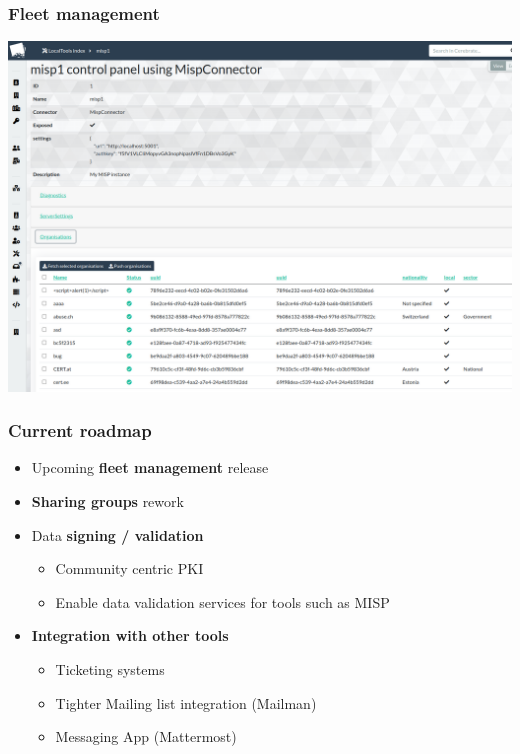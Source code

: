 \begin{frame}
\frametitle{Fleet management}
  \begin{center}
    \includegraphics[width=1\linewidth]{pictures/fleet2.png}
  \end{center}
\end{frame}


\begin{frame}
\frametitle{Current roadmap}
    \begin{itemize}
        \item Upcoming {\bf fleet management} release
        \item {\bf Sharing groups} rework
        \item Data {\bf signing / validation}
        \begin{itemize}
            \item Community centric PKI
            \item Enable data validation services for tools such as MISP
        \end{itemize}
        \item {\bf Integration with other tools}
        \begin{itemize}
            \item Ticketing systems
            \item Tighter Mailing list integration (Mailman)
            \item Messaging App (Mattermost)
        \end{itemize}
    \end{itemize}
\end{frame}
